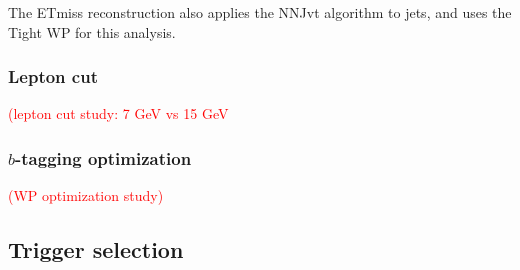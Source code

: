 \documentclass[../thesis.tex]{subfiles}
\begin{document}
The \acs{ETmiss} reconstruction also applies the NNJvt algorithm to jets, and uses the Tight WP for this analysis.\\

\subsubsection*{Lepton \pT cut}
\label{sec:lepptcut}
\textcolor{red}{(lepton \pT cut study: 7 GeV vs 15 GeV}

\subsubsection*{$b$-tagging optimization}
\label{sec:btagopt}
\textcolor{red}{(WP optimization study)}


\subsection{Trigger selection}
\label{sec:trigsec}
\end{document}
